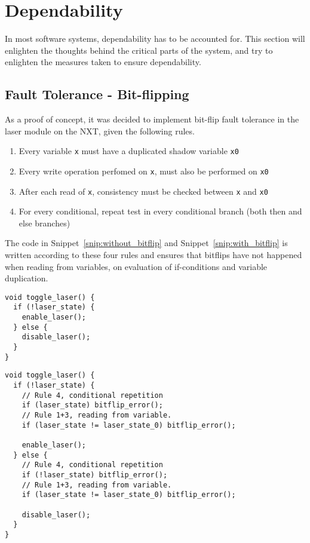 \section{Dependability}\label{Design:Dependability}
In most software systems, dependability has to be accounted for.
This section will enlighten the thoughts behind the critical parts of the system, and try to enlighten the measures taken to ensure dependability.

\subsection{Fault Tolerance - Bit-flipping}
As a proof of concept, it was decided to implement bit-flip fault tolerance in the laser module on the NXT, given the following rules.

\begin{enumerate}
  \item Every variable \texttt{x} must have a duplicated shadow variable \texttt{x0} \cite{errorDetectionSoft}
  \item Every write operation perfomed on \texttt{x}, must also be performed on \texttt{x0} \cite{errorDetectionSoft}
  \item After each read of \texttt{x}, consistency must be checked between \texttt{x} and \texttt{x0} \cite{errorDetectionSoft}
  \item For every conditional, repeat test in every conditional branch (both then and else branches) \cite{errorDetectionSoft}
\end{enumerate}

The code in Snippet~\ref{snip:without_bitflip} and Snippet~\ref{snip:with_bitflip} is written according to these four rules and ensures that bitflips have not happened when reading from variables, on evaluation of if-conditions and variable duplication.

\noindent\begin{minipage}{.45\textwidth}
\begin{lstlisting}[label={snip:without_bitflip},caption={Without~bitflip-security},frame=tlrb,numbers=none]
void toggle_laser() {
  if (!laser_state) {
    enable_laser();
  } else {
    disable_laser();
  }
}
\end{lstlisting}
\end{minipage}\hfill
\begin{minipage}{.45\textwidth}
\begin{lstlisting}[label={snip:with_bitflip},caption={With bitflip-security},frame=tlrb,numbers=none]
void toggle_laser() {
  if (!laser_state) {
    // Rule 4, conditional repetition
    if (laser_state) bitflip_error();
    // Rule 1+3, reading from variable.
    if (laser_state != laser_state_0) bitflip_error();

    enable_laser();
  } else {
    // Rule 4, conditional repetition
    if (!laser_state) bitflip_error();
    // Rule 1+3, reading from variable.
    if (laser_state != laser_state_0) bitflip_error();

    disable_laser();
  }
}
\end{lstlisting}
\end{minipage}

